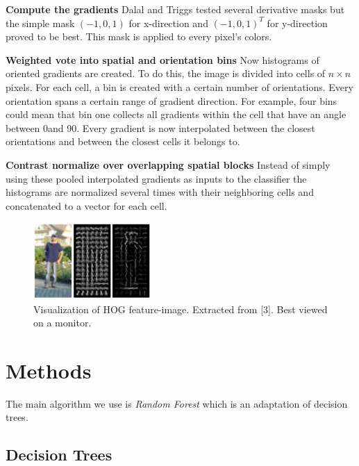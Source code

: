 \documentclass[journal, a4paper]{IEEEtran}
\begin{document}
\textbf{Compute the gradients}\newline
Dalal and Triggs tested several derivative masks but the simple mask $(-1,0,1)$ for x-direction and $(-1,0,1)^T$ for y-direction proved to be best. This mask is applied to every pixel's colors.
\newline

\textbf{Weighted vote into spatial and orientation bins}\newline
Now histograms of oriented gradients are created. To do this, the image is divided into cells of \( n \times n \) pixels. For each cell, a bin is created with a certain number of orientations. Every orientation spans a certain range of gradient direction. For example, four bins could mean that bin one collects all gradients within the cell that have an angle between 0\degree and 90\degree. Every gradient is now interpolated between the closest orientations and between the closest cells it belongs to.\newline

\textbf{Contrast normalize over overlapping spatial blocks}\newline
Instead of simply using these pooled interpolated gradients as inputs to the classifier the histograms are normalized several times with their neighboring cells and concatenated to a vector for each cell.

\begin{figure}[!ht]
	\centering
  \includegraphics[width=0.4\textwidth]{Image2.png}
	\caption{Visualization of HOG feature-image. Extracted from [3]. Best viewed on a monitor.}
	\label{hog}
\end{figure}

\section{Methods}
The main algorithm we use is \textit{Random Forest} which is an adaptation of decision trees.

\subsection{Decision Trees}
\end{document}

